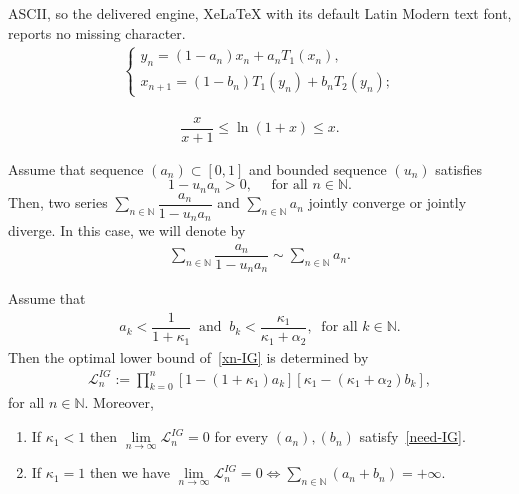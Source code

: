 \documentclass[10pt,a4paper]{amsart}
\begin{document}
ASCII, so the delivered engine, XeLaTeX with its default Latin Modern text font, reports no missing character.
\begin{align}\tag{IG}\label{xn-IG}
\begin{cases} y_{n} = (1-a_n)x_n + a_nT_1(x_n), \\ x_{n+1} = (1-b_n)T_1(y_n) + b_nT_2(y_n); \end{cases}
\end{align}

\begin{align}\label{ln-ineq}
\dfrac{x}{x+1} \le \ln(1+ x) \le x.
\end{align}

\begin{lemma}\label{lem2}
Assume that sequence $(a_n) \subset [0, 1]$ and bounded sequence $(u_n)$  satisfies 
$$1 - u_na_n > 0, \quad \mbox{ for all } n\in \mathbb{N}.$$ 
Then, two series $\displaystyle \sum_{n \in \mathbb{N}} \dfrac{a_n}{1- u_na_n}$ and $\displaystyle \sum_{n \in \mathbb{N}} a_n$ jointly converge or jointly diverge. In this case, we will denote by
\begin{align*}
\sum_{n \in \mathbb{N}} \dfrac{a_n}{1- u_na_n} \sim \sum_{n \in \mathbb{N}} a_n.
\end{align*}
\end{lemma}

\begin{theorem}\label{theo-L-IG}
Assume that  
\begin{align}\label{need-IG}
			a_k < \dfrac{1}{1 + \kappa_1} \ \text{ and } \ b_k < \dfrac{\kappa_1}{\kappa_1 + \alpha_2}, \ \text{ for all } k \in \mathbb{N}.
		\end{align}			
Then the optimal lower bound of~\eqref{xn-IG} is determined by
			\begin{align}\label{Ln-IG}
				\mathcal{L}_n^{IG} := \displaystyle \prod_{k=0}^n  [1 - (1+ \kappa_1)a_k][\kappa_1 - (\kappa_1 + \alpha_2)b_k],
			\end{align}
			for all $n \in \mathbb{N}$. Moreover, 
			\begin{enumerate}
				\item [(i)] If $\kappa_1 < 1$ then $\displaystyle \lim\limits_{n\to \infty} \mathcal{L}_n^{IG} = 0$ for every $(a_n), (b_n)$ satisfy~\eqref{need-IG}.
				\item [(ii)] If $\kappa_1 = 1$ then we have $\displaystyle \lim\limits_{n\to \infty} \mathcal{L}_n^{IG} = 0 \Longleftrightarrow \sum_{n \in \mathbb{N}} (a_n + b_n) = +\infty$. 
			\end{enumerate}
		\end{theorem}
\end{document}
